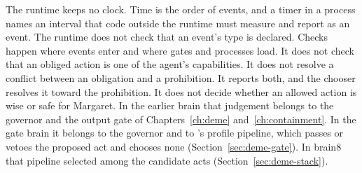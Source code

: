 The runtime keeps no clock. Time is the order of events, and a timer in a process names an interval
that code outside the runtime must measure and report as an event. The runtime does not check that an
event's type is declared. Checks happen where events enter and where gates and processes load. It
does not check that an obliged action is one of the agent's capabilities. It does not resolve a
conflict between an obligation and a prohibition. It reports both, and the chooser resolves it toward
the prohibition. It does not decide whether an allowed action is wise or safe for Margaret. In the
earlier brain that judgement belongs to the governor and the \deme{} output gate of Chapters~\ref{ch:deme}
and~\ref{ch:containment}. In the gate brain it belongs to the governor and to \deme{}'s profile pipeline,
which passes or vetoes the proposed act and chooses none (Section~\ref{sec:deme-gate}). In brain8
that pipeline selected among the candidate acts (Section~\ref{sec:deme-stack}).
